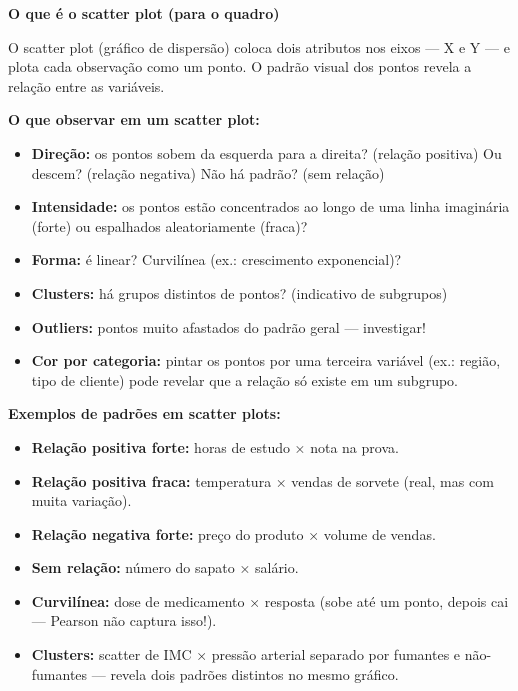 \begin{BoardBox}
\textbf{O que é o scatter plot (para o quadro)}

O scatter plot (gráfico de dispersão) coloca dois atributos nos eixos —
X e Y — e plota cada observação como um ponto. O padrão visual dos pontos
revela a relação entre as variáveis.

\textbf{O que observar em um scatter plot:}
\begin{itemize}
  \item \textbf{Direção:} os pontos sobem da esquerda para a direita?
  (relação positiva) Ou descem? (relação negativa) Não há padrão? (sem relação)
  \item \textbf{Intensidade:} os pontos estão concentrados ao longo de uma
  linha imaginária (forte) ou espalhados aleatoriamente (fraca)?
  \item \textbf{Forma:} é linear? Curvilínea (ex.: crescimento exponencial)?
  \item \textbf{Clusters:} há grupos distintos de pontos? (indicativo de subgrupos)
  \item \textbf{Outliers:} pontos muito afastados do padrão geral — investigar!
  \item \textbf{Cor por categoria:} pintar os pontos por uma terceira variável
  (ex.: região, tipo de cliente) pode revelar que a relação só existe em um subgrupo.
\end{itemize}
\end{BoardBox}

\begin{SolvedBox}
\textbf{Exemplos de padrões em scatter plots:}
\begin{itemize}
  \item \textbf{Relação positiva forte:} horas de estudo × nota na prova.
  \item \textbf{Relação positiva fraca:} temperatura × vendas de sorvete
  (real, mas com muita variação).
  \item \textbf{Relação negativa forte:} preço do produto × volume de vendas.
  \item \textbf{Sem relação:} número do sapato × salário.
  \item \textbf{Curvilínea:} dose de medicamento × resposta (sobe até um ponto,
  depois cai — Pearson não captura isso!).
  \item \textbf{Clusters:} scatter de IMC × pressão arterial separado por fumantes
  e não-fumantes — revela dois padrões distintos no mesmo gráfico.
\end{itemize}
\end{SolvedBox}

